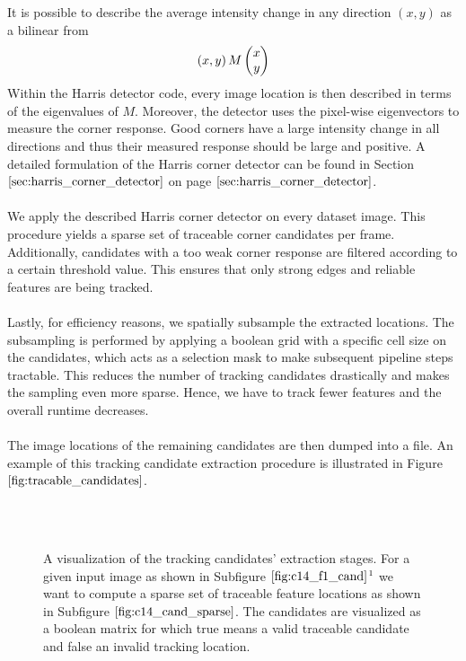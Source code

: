 It is possible to describe the average intensity change in any direction $(x,y)$
as a bilinear from
\begin{equation}
\left( x,y \right) M \colvec{x}{y}	
\end{equation}
Within the Harris detector code, every image location is then described in terms of the eigenvalues of $M$. Moreover, the detector uses the pixel-wise eigenvectors to measure the corner response. Good corners have a large intensity change in all directions and thus their measured response should be large and positive. A detailed formulation of the Harris corner detector can be found in Section $\ref{sec:harris_corner_detector}$ on page $\pageref{sec:harris_corner_detector}$. \\ \\
We apply the described Harris corner detector on every dataset image. This procedure yields a sparse set of traceable corner candidates per frame. Additionally, candidates with a too weak corner response are filtered according to a certain threshold value. This ensures that only strong edges and reliable features are being tracked. \\ \\
Lastly, for efficiency reasons, we spatially subsample the extracted locations. The subsampling is performed by applying a boolean grid with a specific cell size on the candidates, which acts as a selection mask to make subsequent pipeline steps tractable. This reduces the number of tracking candidates drastically and makes the sampling even more sparse. Hence, we have to track fewer features and the overall runtime decreases. \\ \\
The image locations of the remaining candidates are then dumped into a file. An example of this tracking candidate extraction procedure is illustrated in Figure $\ref{fig:tracable_candidates}$. \\ \\
\begin{figure}[H]
\begin{center}
~
\end{center}
\caption[Tracking Candidates]{A visualization of the tracking candidates' extraction stages. For a given input image as shown in Subfigure $\ref{fig:c14_f1_cand}$$\footnotemark$ we want to compute a sparse set of traceable feature locations as shown in Subfigure $\ref{fig:c14_cand_sparse}$. The candidates are visualized as a boolean matrix for which true means a valid traceable candidate and false an invalid tracking location.}
\label{fig:tracable_candidates}
\end{figure}
